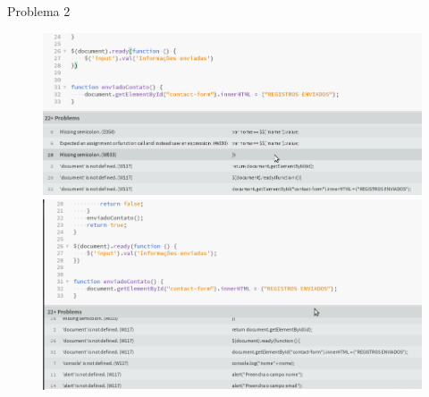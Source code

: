 Problema 2
\begin{figure}[!htb]
\setcounter{figure}{0}
\centering
\begin{minipage}{.5\textwidth}
  \centering
  \includegraphics[width=.9\linewidth]{./img/hint2.png}
\end{minipage}%
\begin{minipage}{.5\textwidth}
  \centering
  \includegraphics[width=.7\linewidth]{./img/hint2-arrumado.png}
\end{minipage}
\end{figure}	



